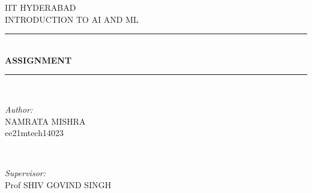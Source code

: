 \documentclass[12pt,a4paper,twoside]{article}
\begin{document}
\begin{titlepage}

\newcommand{\HRule}{\rule{\linewidth}{0.5mm}} %

\center %
 

\textsc{\LARGE IIT HYDERABAD}\\[1.5cm] %
\textsc{\Large INTRODUCTION TO AI AND ML}\\[0.5cm] %


\HRule \\[0.4cm]
{ \huge \bfseries ASSIGNMENT}\\[0.4cm] %
\HRule \\[1.5cm]
 

\begin{minipage}{0.4\textwidth}
\begin{flushleft} \normalsize
\emph{Author:}\\
NAMRATA MISHRA\\
ee21mtech14023%
\end{flushleft}
\end{minipage}
~
\begin{minipage}{0.4\textwidth}
\begin{flushright} \normalsize
\emph{Supervisor:} \\
Prof SHIV GOVIND SINGH %
\end{flushright}
\end{minipage}\\[2cm]



\end{titlepage}
\end{document}
